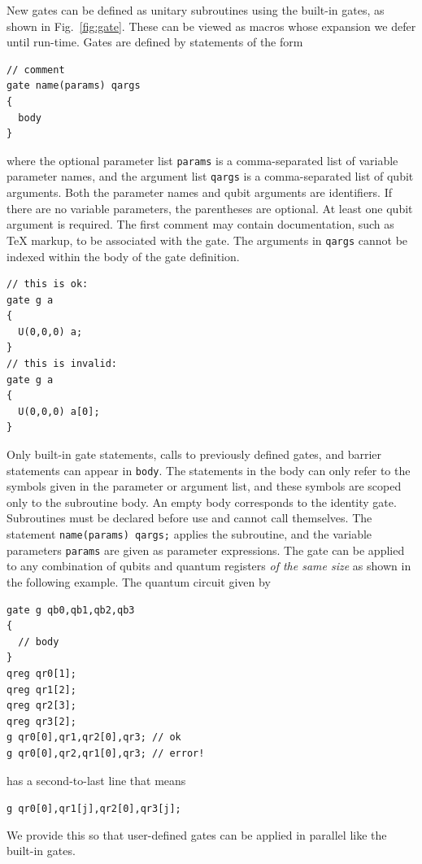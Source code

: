 \documentclass[USenglish,12pt,fleqn]{article} %
\newcommand*{\code}{\texttt}
\begin{document}
New gates can be defined as unitary subroutines using the built-in gates, as shown in Fig.~\ref{fig:gate}. These can be viewed as macros whose expansion we defer until run-time. Gates are defined by statements of the form
\begin{verbatim}
// comment
gate name(params) qargs 
{ 
  body 
}
\end{verbatim}
where the optional parameter list \code{params} is a comma-separated list of variable parameter names, and the argument list \code{qargs} is a comma-separated list of qubit arguments. Both the parameter names and qubit arguments are identifiers. If there are no variable parameters, the parentheses are optional. At least one qubit argument is required. The first comment may contain documentation, such as TeX markup, to be associated with the gate. The arguments in \code{qargs} cannot be indexed within the body of the gate definition. 
\begin{verbatim}
// this is ok:
gate g a 
{ 
  U(0,0,0) a; 
}
// this is invalid:
gate g a 
{ 
  U(0,0,0) a[0]; 
}
\end{verbatim}
Only built-in gate statements, calls to previously defined gates, and barrier statements can appear in \code{body}. The statements in the body can only refer to the symbols given in the parameter or argument list, and these symbols are scoped only to the subroutine body. An empty body corresponds to the identity gate. Subroutines must be declared before use and cannot call themselves. The statement \code{name(params) qargs;} applies the subroutine, and the variable parameters \code{params} are given as parameter expressions. The gate can be applied to any combination of qubits and quantum registers {\em of the same size} as shown in the following example. The quantum circuit given by
\begin{verbatim}
gate g qb0,qb1,qb2,qb3 
{ 
  // body 
}
qreg qr0[1];
qreg qr1[2];
qreg qr2[3];
qreg qr3[2];
g qr0[0],qr1,qr2[0],qr3; // ok
g qr0[0],qr2,qr1[0],qr3; // error!
\end{verbatim}
has a second-to-last line that means
\begin{algorithmic}[0]
 \State \code{g qr0[0],qr1[j],qr2[0],qr3[j];}
 \EndFor
\end{algorithmic}
We provide this so that user-defined gates can be applied in parallel like the built-in gates.
\end{document}
